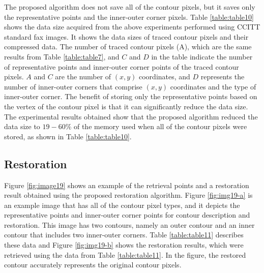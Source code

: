 The proposed algorithm does not save all of the contour pixels, but it saves only the representative points and the inner-outer corner pixels. Table \ref{table:table10} shows the data size acquired from the above experiments performed using CCITT standard fax images. It shows the data sizes of traced contour pixels and their compressed data. The number of traced contour pixels (A), which are the same results from Table \ref{table:table7}, and $C$ and $D$ in the table indicate the number of representative points and inner-outer corner points of the traced contour pixels. $A$ and $C$ are the number of $(x, y)$ coordinates, and $D$ represents the number of inner-outer corners that comprise $(x, y)$ coordinates and the type of inner-outer corner. The benefit of storing only the representative points based on the vertex of the contour pixel is that it can significantly reduce the data size. The experimental results obtained show that the proposed algorithm reduced the data size to $19-60\%$ of the memory used when all of the contour pixels were stored, as shown in Table \ref{table:table10}.



\subsection{Restoration}


Figure \ref{fig:image19} shows an example of the retrieval points and a restoration result obtained using the proposed restoration algorithm. Figure \ref{fig:img19-a} is an example image that has all of the contour pixel types, and it depicts the representative points and inner-outer corner points for contour description and restoration. This image has two contours, namely an outer contour and an inner contour that includes two inner-outer corners. Table \ref{table:table11} describes these data and Figure \ref{fig:img19-b} shows the restoration results, which were retrieved using the data from Table \ref{table:table11}. In the figure, the restored contour accurately represents the original contour pixels.

